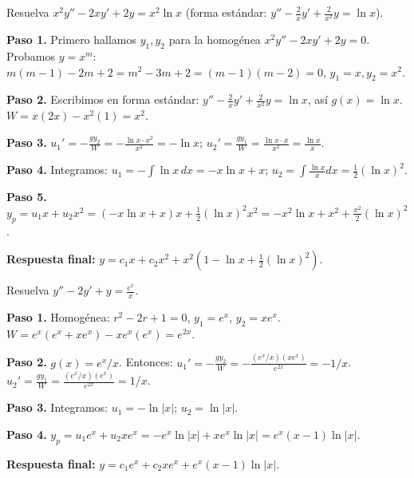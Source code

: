 \begin{example}[$g(x) = \ln x$]
Resuelva $x^2 y'' - 2x y' + 2y = x^2 \ln x$ (forma estándar: $y'' - \frac{2}{x}y' + \frac{2}{x^2}y = \ln x$).

\begin{myproof}
\textbf{Paso 1.} Primero hallamos $y_1, y_2$ para la homogénea $x^2 y'' - 2x y' + 2y = 0$. Probamos $y=x^m$: $m(m-1)-2m+2 = m^2 -3m+2 = (m-1)(m-2)=0$, $y_1=x, y_2=x^2$.

\textbf{Paso 2.} Escribimos en forma estándar: $y'' - \frac{2}{x}y' + \frac{2}{x^2}y = \ln x$, así $g(x)=\ln x$. $W = x(2x) - x^2(1) = x^2$.

\textbf{Paso 3.} $u_1' = -\frac{g y_2}{W} = -\frac{\ln x \cdot x^2}{x^2} = -\ln x$; $u_2' = \frac{g y_1}{W} = \frac{\ln x \cdot x}{x^2} = \frac{\ln x}{x}$.

\textbf{Paso 4.} Integramos: $u_1 = -\int \ln x \, dx = -x\ln x + x$; $u_2 = \int \frac{\ln x}{x} dx = \frac{1}{2}(\ln x)^2$.

\textbf{Paso 5.} $y_p = u_1 x + u_2 x^2 = (-x\ln x + x)x + \frac{1}{2}(\ln x)^2 x^2 = -x^2\ln x + x^2 + \frac{x^2}{2}(\ln x)^2$.

\textbf{Respuesta final:} $\boxed{y = c_1 x + c_2 x^2 + x^2\left(1 - \ln x + \frac{1}{2}(\ln x)^2\right).}$
\end{myproof}
\end{example}

\begin{example}[$g(x) = e^x$ con coeficientes variables]
Resuelva $y'' - 2y' + y = \frac{e^x}{x}$.

\begin{myproof}
\textbf{Paso 1.} Homogénea: $r^2 - 2r + 1=0$, $y_1=e^x$, $y_2=x e^x$. $W = e^x(e^x + x e^x) - x e^x (e^x) = e^{2x}$.

\textbf{Paso 2.} $g(x) = e^x/x$. Entonces:
$u_1' = -\frac{g y_2}{W} = -\frac{(e^x/x)(x e^x)}{e^{2x}} = -1/x$.
$u_2' = \frac{g y_1}{W} = \frac{(e^x/x)(e^x)}{e^{2x}} = 1/x$.

\textbf{Paso 3.} Integramos: $u_1 = -\ln|x|$; $u_2 = \ln|x|$.

\textbf{Paso 4.} $y_p = u_1 e^x + u_2 x e^x = -e^x \ln|x| + x e^x \ln|x| = e^x (x-1)\ln|x|$.

\textbf{Respuesta final:} $\boxed{y = c_1 e^x + c_2 x e^x + e^x(x-1)\ln|x|.}$
\end{myproof}
\end{example}

